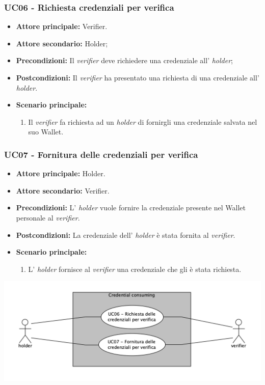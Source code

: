 \subsubsection{UC06 - Richiesta credenziali per verifica}
\begin{itemize}
\item \textbf{Attore principale:} Verifier.
\item \textbf{Attore secondario:} Holder; 
\item \textbf{Precondizioni:} Il \textit{verifier} deve richiedere una credenziale all' \textit{holder};
\item \textbf{Postcondizioni:} Il \textit{verifier} ha presentato una richiesta di una credenziale all' \textit{holder}.
\item \textbf{Scenario principale:} 
    \begin{enumerate}
        \item Il \textit{verifier} fa richiesta ad un \textit{holder} di fornirgli una credenziale salvata nel suo Wallet.
    \end{enumerate}
\end{itemize}

\subsubsection{UC07 - Fornitura delle credenziali per verifica}
\begin{itemize}
\item \textbf{Attore principale:} Holder. 
\item \textbf{Attore secondario:} Verifier.
\item \textbf{Precondizioni:} L’ \textit{holder} vuole fornire la credenziale presente nel Wallet personale al \textit{verifier}.
\item \textbf{Postcondizioni:} La credenziale dell’ \textit{holder} è stata fornita al \textit{verifier}.
\item \textbf{Scenario principale:} 
    \begin{enumerate}
        \item L' \textit{holder} fornisce al \textit{verifier} una credenziale che gli è stata richiesta.
    \end{enumerate}
\end{itemize}
\begin{center}
    \includegraphics[scale = 0.65]{./res/img/credentialConsuming.png}
\end{center}
